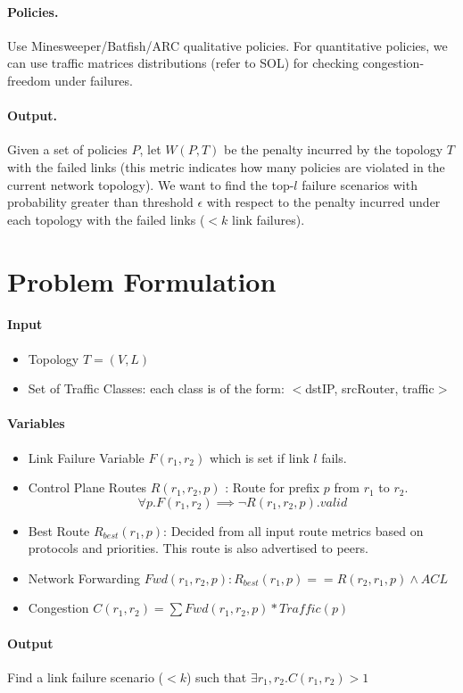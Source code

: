 \documentclass[]{article}
\begin{document}
\paragraph{Policies.} Use Minesweeper/Batfish/ARC qualitative policies.
For quantitative policies, we can use traffic matrices distributions 
(refer to SOL) for checking congestion-freedom under failures. 

\paragraph{Output.} Given a set of policies $P$, let $W(P, T)$ 
be the penalty incurred by the topology $T$ with the failed links 
(this metric indicates how many policies are violated in the 
current network topology). We want to find the top-$l$ failure scenarios
with probability greater than threshold $\epsilon$ with respect to 
the penalty incurred under each topology with the failed links ($< k$ link
failures).

 
\begin{small}
	
\end{small}

\newpage
\section{Problem Formulation}
\noindent\paragraph{Input}
\begin{itemize}
\item Topology $T = (V, L)$
\item Set of Traffic Classes: each class is of the form: $<$dstIP, srcRouter, traffic$>$
\end{itemize}
\noindent\paragraph{Variables}
\begin{itemize}
\item Link Failure Variable $F(r_1, r_2)$ which is set if link $l$ fails.
\item Control Plane Routes $R(r_1, r_2, p)$ : Route for prefix $p$ from $r_1$ to $r_2$. 
\begin{equation*}
\forall p. F(r_1, r_2) \implies \neg R(r_1, r_2, p).valid 
\end{equation*}
\item Best Route $R_{best}(r_1, p)$: Decided from all input route metrics based on protocols and priorities. 
This route is also advertised to peers.
\item Network Forwarding $Fwd(r_1, r_2, p): R_{best}(r_1, p) == R(r_2, r_1, p) \wedge ACL$
\item Congestion $C(r_1, r_2) = \sum Fwd(r_1, r_2, p) * Traffic(p)$ 
\end{itemize}

\noindent\paragraph{Output} Find a link failure scenario ($< k$) such that $\exists r_1, r_2. C(r_1, r_2) > 1$
\end{document}
